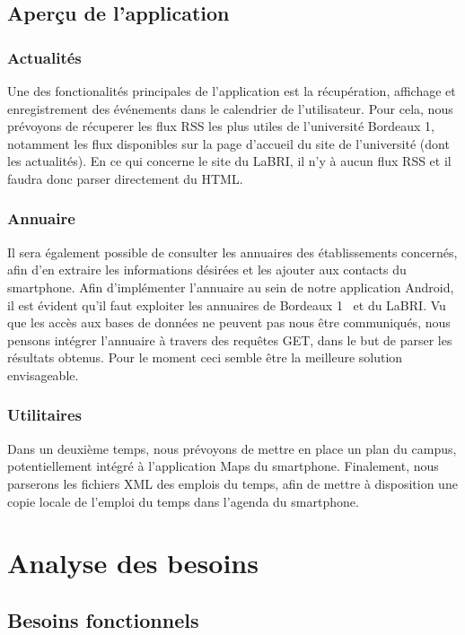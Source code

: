 \documentclass [pdftex,12pt] {report}
\begin{document}
\section{Aperçu de l'application}

\subsection{Actualités}
Une des fonctionalités principales de l'application est la récupération, affichage et enregistrement des événements dans le calendrier de l'utilisateur. 
Pour cela, nous prévoyons de récuperer les flux RSS les plus utiles de l'université Bordeaux 1\cite{fluxBDX1}, notamment les flux disponibles sur la page d'accueil du site de l'université (dont les actualités).
En ce qui concerne le site du LaBRI, il n'y à aucun flux RSS et il faudra donc parser directement du HTML.

\subsection{Annuaire}
Il sera également possible de consulter les annuaires des établissements concernés, afin d'en extraire les informations désirées et les ajouter aux contacts du smartphone.
Afin d'implémenter l'annuaire au sein de notre application Android, il est évident qu'il faut exploiter les annuaires de Bordeaux 1~\cite{AnnuaireBdx1} et du LaBRI. Vu que les accès aux bases de données ne peuvent pas nous être communiqués, nous pensons intégrer l'annuaire à travers des requêtes GET, dans le but de parser les résultats obtenus. Pour le moment ceci semble être la meilleure solution envisageable.

\subsection{Utilitaires}
Dans un deuxième temps, nous prévoyons de mettre en place un plan du campus, potentiellement intégré à l'application Maps du smartphone.
Finalement, nous parserons les fichiers XML des emplois du temps\cite{EdTxml}, afin de mettre à disposition une copie locale de l'emploi du temps dans l'agenda du smartphone.


\chapter{Analyse des besoins}

\section{Besoins fonctionnels}
\end{document}
